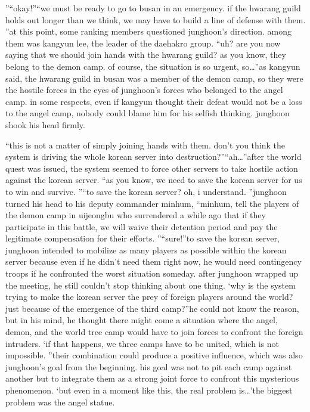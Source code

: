 ”“okay!”“we must be ready to go to busan in an emergency.
 if the hwarang guild holds out longer than we think, we may have to build a line of defense with them.
”at this point, some ranking members questioned junghoon’s direction.
 among them was kangyun lee, the leader of the daehakro group.
“uh? are you now saying that we should join hands with the hwarang guild? as you know, they belong to the demon camp.
 of course, the situation is so urgent, so…”as kangyun said, the hwarang guild in busan was a member of the demon camp, so they were the hostile forces in the eyes of junghoon’s forces who belonged to the angel camp.
in some respects, even if kangyun thought their defeat would not be a loss to the angel camp, nobody could blame him for his selfish thinking.
junghoon shook his head firmly.


“this is not a matter of simply joining hands with them.
 don’t you think the system is driving the whole korean server into destruction?”“ah…”after the world quest was issued, the system seemed to force other servers to take hostile action against the korean server.
“as you know, we need to save the korean server for us to win and survive.
”“to save the korean server? oh, i understand.
”junghoon turned his head to his deputy commander minhum, “minhum, tell the players of the demon camp in uijeongbu who surrendered a while ago that if they participate in this battle, we will waive their detention period and pay the legitimate compensation for their efforts.
”“sure!”to save the korean server, junghoon intended to mobilize as many players as possible within the korean server because even if he didn’t need them right now, he would need contingency troops if he confronted the worst situation someday.
after junghoon wrapped up the meeting, he still couldn’t stop thinking about one thing.
‘why is the system trying to make the korean server the prey of foreign players around the world? just because of the emergence of the third camp?”he could not know the reason, but in his mind, he thought there might come a situation where the angel, demon, and the world tree camp would have to join forces to confront the foreign intruders.
‘if that happens, we three camps have to be united, which is not impossible.
”their combination could produce a positive influence, which was also junghoon’s goal from the beginning.
his goal was not to pit each camp against another but to integrate them as a strong joint force to confront this mysterious phenomenon.
‘but even in a moment like this, the real problem is…’the biggest problem was the angel statue.


 